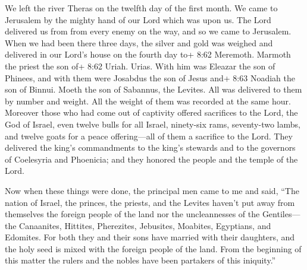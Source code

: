  We left the river Theras on the twelfth day of the first
month. We came to Jerusalem by the mighty hand of our Lord which was
upon us. The Lord delivered us from from every enemy on the way, and so
we came to Jerusalem.  When we had been there three days,
the silver and gold was weighed and delivered in our Lord's house on the
fourth day to+ 8:62 Meremoth. Marmoth the priest the son of+ 8:62 Uriah.
Urias.  With him was Eleazar the son of Phinees, and with
them were Josabdus the son of Jesus and+ 8:63 Noadiah the son of Binnui.
Moeth the son of Sabannus, the Levites. All was delivered to them by
number and weight.  All the weight of them was recorded at
the same hour.  Moreover those who had come out of
captivity offered sacrifices to the Lord, the God of Israel, even twelve
bulls for all Israel, ninety-six rams,  seventy-two lambs,
and twelve goats for a peace offering---all of them a sacrifice to the
Lord.  They delivered the king's commandments to the king's
stewards and to the governors of Coelesyria and Phoenicia; and they
honored the people and the temple of the Lord.

 Now when these things were done, the principal men came to
me and said,  ``The nation of Israel, the princes, the
priests, and the Levites haven't put away from themselves the foreign
people of the land nor the uncleannesses of the Gentiles---the
Canaanites, Hittites, Pherezites, Jebusites, Moabites, Egyptians, and
Edomites.  For both they and their sons have married with
their daughters, and the holy seed is mixed with the foreign people of
the land. From the beginning of this matter the rulers and the nobles
have been partakers of this iniquity.''

